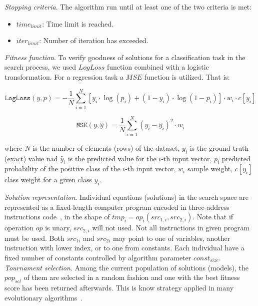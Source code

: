 \documentclass{bmcart}
\begin{document}
\textit{ Stopping criteria}. The algorithm run until at least one of the two criteria is met:
 \begin{itemize}
 	\item  $time_{limit}$: Time limit is reached.
 	\item $iter_{limit}$: Number of iteration has exceeded.
 \end{itemize}

\textit{Fitness function}. To verify goodness of solutions for a classification task in the search process, we used $LogLoss$ function combined with a logistic transformation. For a regression task a $MSE$ function is utilized. That is:

\begin{equation}\label{eq:fitness-hroch-classification} 
	\texttt{LogLoss}(y, p) = -\frac{1}{N} \sum_{i=1}^{N} [ y_i \cdot \log(p_i) + (1 - y_i) \cdot \log(1 - p_i) ] \cdot w_i \cdot c[y_i]
\end{equation}

\begin{equation}\label{eq:fitness-hroch-regression} 
\texttt{MSE}(y, \hat{y}) = \frac{1}{N} \sum_{i=1}^{N} (y_i - \hat{y}_i)^2 \cdot w_i
\end{equation}

where $N$ is the number of elements (rows) of the dataset, $y_i$ is the ground truth (exact) value nad $\hat{y}_i$ is the predicted value for the $i$-th input vector, $p_i$ predicted probability of the positive class of the $i$-th input vector, $w_i$ sample weight, $c[y_i]$ class weight for a given class $y_i$. 

\textit{Solution representation}. Individual equations (solutions) in the search space  are represented as a fixed-length computer program encoded in three-address instructions code~\cite{oltean2002multi}, in the shape of $tmp_{i} = op_i(src_{1,i}, src_{2,i})$. Note that if  operation ${op}$ is unary, ${src}_{2,i}$ will not used. %
Not all instructions in given program must be used. Both $src_{1i}$ and $src_{2i}$ may point to one of variables, another instruction with lower index, or to one from constants. Each individual have a fixed number of constants controlled by algorithm parameter $const_{size}$. 
 \\
\textit{Tournament selection}. Among the current population of solutions (models), the $pop_{sel}$ of them are selected in a random fashion and one with the best fitness score has been returned afterwards. This is know strategy applied in many evolutionary algorithms~\cite{blickle1995mathematical}. 
\end{document}
